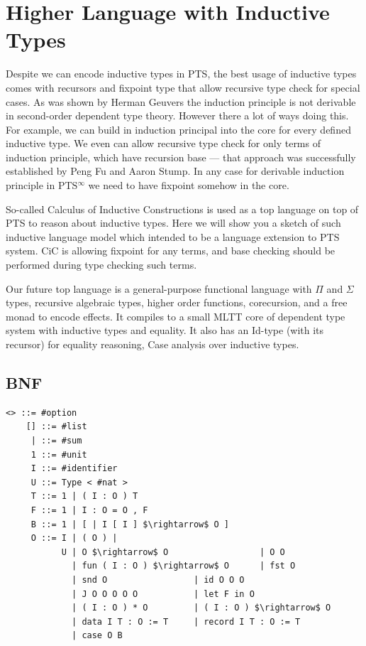 \documentclass{aip-cp}
\begin{document}
\section{Higher Language with Inductive Types}
Despite we can encode inductive types in PTS, the best usage of inductive types
comes with recursors and fixpoint type that allow recursive type check for special cases.
As was shown by Herman Geuvers\cite{Geuvers01} the induction principle is not derivable in second-order
dependent type theory. However there a lot of ways doing this. For example, we can
build in induction principal into the core for every defined inductive type. We even
can allow recursive type check for only terms of induction principle, which have recursion base ---
that approach was successfully established by Peng Fu and Aaron Stump\cite{Stump17}.
In any case for derivable induction principle in PTS$^\infty$ we need to have fixpoint
somehow in the core.

So-called Calculus of Inductive Constructions\cite{Mohring15} is used as a top language on top of
PTS to reason about inductive types. Here we will show you a sketch of such
inductive language model which intended to be a language extension to PTS system.
CiC is allowing fixpoint for any terms, and base checking should be performed
during type checking such terms.

Our future top language is a general-purpose functional language with $\Pi$ and $\Sigma$ types,
recursive algebraic types, higher order functions,
corecursion, and a free monad to encode effects. It compiles
to a small MLTT core of dependent type system with inductive types and equality.
It also has an Id-type (with its recursor) for equality reasoning,
Case analysis over inductive types.

\subsection{BNF}

\begin{lstlisting}[mathescape=true]
    <> ::= #option
    [] ::= #list
     | ::= #sum
     1 ::= #unit
     I ::= #identifier
     U ::= Type < #nat >
     T ::= 1 | ( I : O ) T
     F ::= 1 | I : O = O , F
     B ::= 1 | [ | I [ I ] $\rightarrow$ O ]
     O ::= I | ( O ) |
           U | O $\rightarrow$ O                  | O O
             | fun ( I : O ) $\rightarrow$ O      | fst O
             | snd O                 | id O O O
             | J O O O O O           | let F in O
             | ( I : O ) * O         | ( I : O ) $\rightarrow$ O
             | data I T : O := T     | record I T : O := T
             | case O B
\end{lstlisting}
\end{document}

